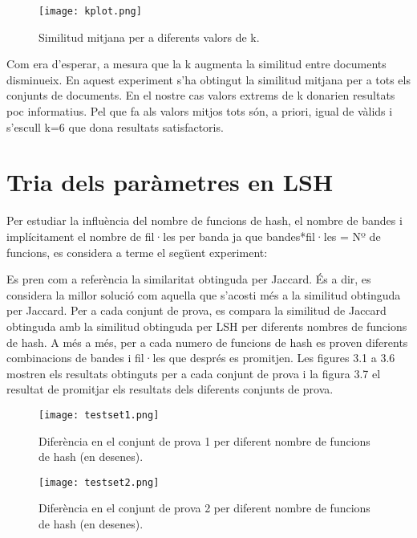 \documentclass[catalan, 12pt]{report}
\begin{document}
\newpage
\begin{figure}[!h]
  \centering
  \texttt{[image: kplot.png]}
  \centering
  \caption[Caption for LOF]{Similitud mitjana per a diferents valors de k.\protect}
\end{figure}


Com era d'esperar, a mesura que la k augmenta la similitud entre documents disminueix. En aquest experiment s'ha obtingut la similitud mitjana per a tots els conjunts de documents. En el nostre cas valors extrems de k donarien resultats poc informatius. Pel que fa als valors mitjos tots són, a priori, igual de vàlids i s'escull k=6 que dona resultats satisfactoris.

\newpage
\section{Tria dels paràmetres en LSH}

Per estudiar la influència del nombre de funcions de hash, el nombre de bandes i implícitament el nombre de fil·les per banda ja que bandes*fil·les = Nº de funcions, es considera a terme el següent experiment: \newline

Es pren com a referència la similaritat obtinguda per Jaccard. És a dir, es considera la millor solució com aquella que s'acosti més a la similitud obtinguda per Jaccard. Per a cada conjunt de prova, es compara la similitud de Jaccard obtinguda amb la similitud obtinguda per LSH per diferents nombres de funcions de hash. A més a més, per a cada numero de funcions de hash es proven diferents combinacions de bandes i fil·les que després es promitjen. Les figures 3.1 a 3.6 mostren els resultats obtinguts per a cada conjunt de prova i la figura 3.7 el resultat de promitjar els resultats dels diferents conjunts de prova. \newline

\begin{figure}[!h]
  \centering
  \texttt{[image: testset1.png]}
  \centering
  \caption[Caption for LOF]{Diferència en el conjunt de prova 1 per diferent nombre de funcions de hash (en desenes).\protect}
\end{figure}

\begin{figure}[!h]
  \centering
  \texttt{[image: testset2.png]}
  \centering
  \caption[Caption for LOF]{Diferència en el conjunt de prova 2 per diferent nombre de funcions de hash (en desenes).\protect}
\end{figure}
\end{document}
